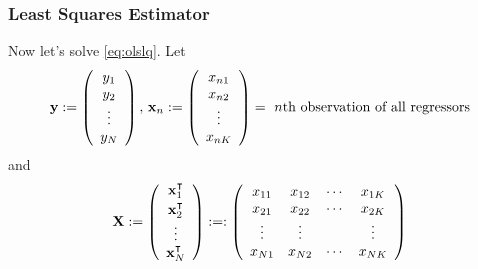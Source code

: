 \begin{frame}\frametitle{Least Squares Estimator}

    \vspace{2em}
    Now let's solve \eqref{eq:olslq}. Let 
    \small \begin{equation*}
        \label{eq:design0}
        {\mathbf y} := 
        \left(
        \begin{array}{c}
            y_1 \\
            y_2 \\
            \vdots \\
            y_N
        \end{array}
        \right),\,
        {\mathbf x}_n := 
        \left(
        \begin{array}{c}
            x_{n1} \\ 
            x_{n2} \\
            \vdots \\
            x_{nK}
        \end{array}
        \right)
        = \text{ $n$th observation of all regressors}
    \end{equation*}
    and
    \small \begin{equation*}
        \label{eq:design}
        \boldX := 
        \left(
        \begin{array}{c}
            \boldx_1^\T  \vspace{0.2em}  \\
            \boldx_2^\T  \\
            \vdots     \\
            \boldx_N^\T  
        \end{array}
        \right)
        :=:
        \left(
        \begin{array}{cccc}
            x_{11} & x_{12} & \cdots & x_{1K} \\
            x_{21} & x_{22} & \cdots & x_{2K} \\
            \vdots & \vdots &  & \vdots \\
            x_{N1} & x_{N2} & \cdots & x_{NK} 
        \end{array}
        \right)
    \end{equation*}
    
\end{frame}


